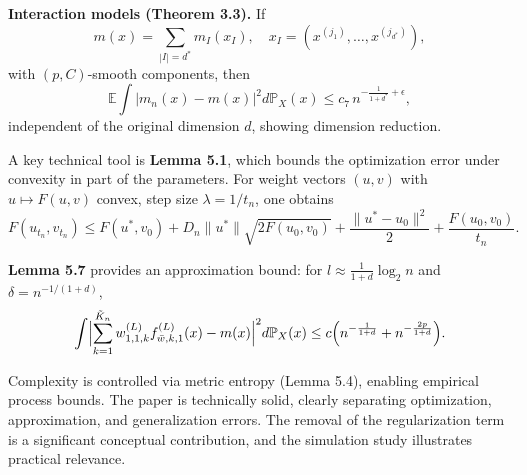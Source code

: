 \documentclass[11pt]{article}
\begin{document}
\medskip
\noindent \textbf{Interaction models (Theorem 3.3).} 
If
$$
m(x)=\sum_{|I|=d^*} m_I(x_I),\quad x_I=(x^{(j_1)},\dots,x^{(j_{d^*})}),
$$
with $(p,C)$-smooth components, then
$$
\mathbb{E}\int |m_n(x)-m(x)|^2 d\mathbb{P}_X(x)\le c_7\, n^{-\frac{1}{1+d^*}+\epsilon},
$$
independent of the original dimension $d$, showing dimension reduction.

\medskip
\noindent A key technical tool is \textbf{Lemma 5.1}, which bounds the optimization error under convexity in part of the parameters. For weight vectors $(u,v)$ with $u\mapsto F(u,v)$ convex, step size $\lambda=1/t_n$, one obtains
$$
F(u_{t_n},v_{t_n})\le F(u^*,v_0)+D_n\|u^*\|\sqrt{2F(u_0,v_0)}+\frac{\|u^*-u_0\|^2}{2}+\frac{F(u_0,v_0)}{t_n}.
$$

\noindent \textbf{Lemma 5.7} provides an approximation bound: for $l\approx \frac{1}{1+d}\log_2 n$ and $\delta=n^{-1/(1+d)}$,
$$
\int \Bigl|\sum_{k=1}^{\tilde K_n} w_{1,1,k}^{(L)} f_{\bar w,k,1}^{(L)}(x)-m(x)\Bigr|^2 d\mathbb{P}_X(x)\le c\Bigl(n^{-\frac{1}{1+d}}+n^{-\frac{2p}{1+d}}\Bigr).
$$

Complexity is controlled via metric entropy (Lemma 5.4), enabling empirical process bounds. The paper is technically solid, clearly separating optimization, approximation, and generalization errors. The removal of the regularization term is a significant conceptual contribution, and the simulation study illustrates practical relevance. 
\end{document}
